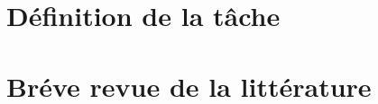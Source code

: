 \documentclass[11pt]{article.cls}
\begin{document}
\section{Définition de la tâche}

\section{Bréve revue de la littérature}
\end{document}
